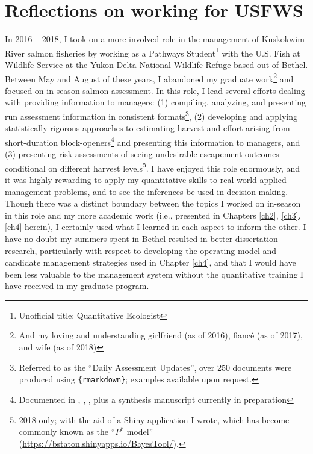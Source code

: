 \documentclass[12pt,]{book}
\let\rmarkdownfootnote\footnote%
\def\footnote{\protect\rmarkdownfootnote}
\theoremstyle{definition}
\theoremstyle{definition}
\theoremstyle{definition}
\theoremstyle{remark}
\begin{document}
\section{Reflections on working for
USFWS}\label{reflections-on-working-for-usfws}

\noindent
In 2016 -- 2018, I took on a more-involved role in the management of
Kuskokwim River salmon fisheries by working as a Pathways
Student\footnote{Unofficial title: Quantitative Ecologist} with the U.S.
Fish at Wildlife Service at the Yukon Delta National Wildlife Refuge
based out of Bethel. Between May and August of these years, I abandoned
my graduate work\footnote{And my loving and understanding girlfriend (as
  of 2016), fiancé (as of 2017), and wife (as of 2018)} and focused on
in-season salmon assessment. In this role, I lead several efforts
dealing with providing information to managers: (1) compiling,
analyzing, and presenting run assessment information in consistent
formats\footnote{Referred to as the ``Daily Assessment Updates'', over
  250 documents were produced using \texttt{\{rmarkdown\}}; examples
  available upon request.}, (2) developing and applying
statistically-rigorous approaches to estimating harvest and effort
arising from short-duration block-openers\footnote{Documented in
  \citet{staton-coggins-2016}, \citet{staton-coggins-2017},
  \citet{staton-2018}, plus a synthesis manuscript currently in
  preparation} and presenting this information to managers, and (3)
presenting risk assessments of seeing undesirable escapement outcomes
conditional on different harvest levels\footnote{2018 only; with the aid
  of a Shiny application I wrote, which has become commonly known as the
  ``\(P^*\) model'' (\url{https://bstaton.shinyapps.io/BayesTool/}).}. I
have enjoyed this role enormously, and it was highly rewarding to apply
my quantitative skills to real world applied management problems, and to
see the inferences be used in decision-making. Though there was a
distinct boundary between the topics I worked on in-season in this role
and my more academic work (i.e., presented in Chapters \ref{ch2},
\ref{ch3}, \ref{ch4} herein), I certainly used what I learned in each
aspect to inform the other. I have no doubt my summers spent in Bethel
resulted in better dissertation research, particularly with respect to
developing the operating model and candidate management strategies used
in Chapter \ref{ch4}, and that I would have been less valuable to the
management system without the quantitative training I have received in
my graduate program.
\end{document}
